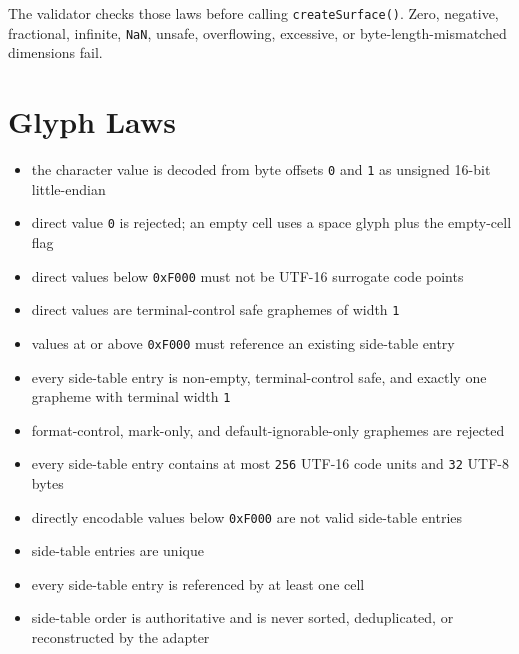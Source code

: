 The validator checks those laws before calling \texttt{c\allowbreak{}r\allowbreak{}e\allowbreak{}a\allowbreak{}t\allowbreak{}e\allowbreak{}S\allowbreak{}u\allowbreak{}r\allowbreak{}f\allowbreak{}a\allowbreak{}c\allowbreak{}e\allowbreak{}(\allowbreak{})}. Zero, negative, fractional, infinite, \texttt{N\allowbreak{}a\allowbreak{}N}, unsafe, overflowing, excessive, or byte-length-mismatched dimensions fail.

\section{Glyph Laws}\label{record-164-glyph-laws}

\begin{itemize}
\tightlist
\item
  the character value is decoded from byte offsets \texttt{0} and \texttt{1} as unsigned 16-bit little-endian
\item
  direct value \texttt{0} is rejected; an empty cell uses a space glyph plus the empty-cell flag
\item
  direct values below \texttt{0\allowbreak{}x\allowbreak{}F\allowbreak{}0\allowbreak{}0\allowbreak{}0} must not be UTF-16 surrogate code points
\item
  direct values are terminal-control safe graphemes of width \texttt{1}
\item
  values at or above \texttt{0\allowbreak{}x\allowbreak{}F\allowbreak{}0\allowbreak{}0\allowbreak{}0} must reference an existing side-table entry
\item
  every side-table entry is non-empty, terminal-control safe, and exactly one grapheme with terminal width \texttt{1}
\item
  format-control, mark-only, and default-ignorable-only graphemes are rejected
\item
  every side-table entry contains at most \texttt{2\allowbreak{}5\allowbreak{}6} UTF-16 code units and \texttt{3\allowbreak{}2} UTF-8 bytes
\item
  directly encodable values below \texttt{0\allowbreak{}x\allowbreak{}F\allowbreak{}0\allowbreak{}0\allowbreak{}0} are not valid side-table entries
\item
  side-table entries are unique
\item
  every side-table entry is referenced by at least one cell
\item
  side-table order is authoritative and is never sorted, deduplicated, or reconstructed by the adapter
\end{itemize}

